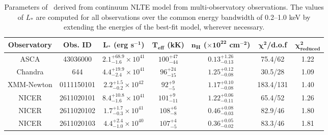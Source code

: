 	
	\begin{table}[!htb]
    	\centering
    	\caption{Parameters of \source\ derived from continuum NLTE model from multi-observatory observations. The values of $L_*$ are computed for all observations over the common energy bandwidth of 0.2--1.0 keV by extending the energies of the best-fit model, wherever necessary.}
    	\label{tab:res-fitting}
    	\begin{tabular}{ccccccc}
			\hline
			{\textbf{Observatory}} & {\textbf{Obs. ID}} & {$\boldsymbol{L_*}$ \textbf{(erg s$\boldsymbol{^{-1}}$)}} & {\textbf{$\boldsymbol{T_\text{eff}}$ (kK)}} & {\textbf{$\boldsymbol{n_H}$ ($\boldsymbol{\times 10^{22}}$ cm$\boldsymbol{^{-2}}$)}} & {$\boldsymbol{\chi^2}$/\textbf{d.o.f}} & {$\boldsymbol{\chi^2_\text{reduced}}$} \\
			\hline
			{ASCA} & {43036000} & {$2.1_{-1.6}^{+68.9}\times 10^{41}$} & {$100_{-44}^{+47}$} & {$0.13_{-0.13}^{+1.26}$} & {75.4/62} & {1.22} \\ %
			{Chandra} & {644} & {$4.4_{-2.4}^{+19.9}\times 10^{41}$} & {$96_{-15}^{+24}$} & {$1.25_{-0.08}^{+0.12}$} & {30.5/28} & {1.09} \\ %
			{XMM-Newton} & {0111150101} & {$2.2_{-0.2}^{+1.5}\times 10^{42}$} & {$92_{-5}^{+9}$} & {$1.17_{-0.08}^{+0.10}$} & {183.4/131} & {1.40} \\ %
			{NICER} & {2611020101} & {$8.4_{-1.6}^{+10.8}\times 10^{41}$} & {$101_{-11}^{+9}$} & {$1.22_{-0.11}^{+0.06}$} & {65.4/52} & {1.26} \\ %
			{NICER} & {2611020102} & {$1.7_{-0.3}^{+1.7}\times 10^{41}$} & {$108_{-8}^{+6}$} & {$0.46_{-0.03}^{+0.08}$} & {82.9/46} & {1.80} \\ %
			{NICER} & {2611020103} & {$4.4_{-1.0}^{+2.4}\times 10^{40}$} & {$107_{-5}^{+4}$} & {$0.36_{-0.02}^{+0.05}$} & {83.3/46} & {1.81} \\ %
			\hline
		\end{tabular}
	\end{table}
    
